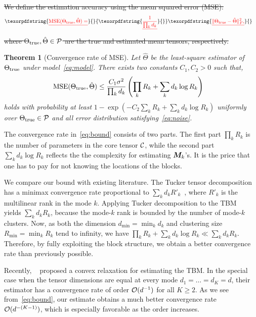 \documentclass[11pt]{article}
\theoremstyle{plain}
\newtheorem{theorem}{Theorem}
\theoremstyle{definition}
\providecommand{\DIFaddtex}[1]{{\protect\color{blue}\uwave{#1}}} %
\providecommand{\DIFdeltex}[1]{{\protect\color{red}\sout{#1}}}                      %
\providecommand{\DIFaddbegin}{} %
\providecommand{\DIFaddend}{} %
\providecommand{\DIFdelbegin}{} %
\providecommand{\DIFdelend}{} %
\providecommand{\DIFadd}[1]{\texorpdfstring{\DIFaddtex{#1}}{#1}} %
\providecommand{\DIFdel}[1]{\texorpdfstring{\DIFdeltex{#1}}{}} %
\begin{document}
\DIFdelbegin \DIFdel{We define the estimation accuracy using the mean squared error (MSE):
}\begin{displaymath}\DIFdel{%
\text{MSE}(\trueT,\hat \Theta)=}{\DIFdel{1\over \prod_k d_k}}\DIFdel{\FnormSize{}{\trueT-\hat \Theta}^2,
}\end{displaymath}
\DIFdel{where $\Theta_{\text{true}}, \hat \Theta\in\mathcal{P}$ are the true and estimated mean tensors, respectively.
}%

\DIFdelend \DIFaddbegin \begin{theorem}[Convergence rate of MSE] \label{thm:mse}
\DIFaddend Let $\hat \Theta$ be the least-square estimator of $\Theta_{\text{true}}$ under model~\eqref{eq:model}. There exists two constants $C_1, C_2>0$ such that,  
\begin{equation} \label{eq:bound}
\text{MSE}(\Theta_{\text{true}},\hat \Theta)\leq {C_1 \sigma^2\over  \prod_k d_k} \left(\prod_k R_k+\sum_k d_k \log R_k\right)
\end{equation}
holds with probability at least $1-\exp(-C_2\sum_k R_k+\sum_k d_k\log R_k)$ uniformly over $\Theta_{\text{true}}\in\mathcal{P}$ and all error distribution satisfying~\eqref{eq:noise}. 
\end{theorem}

The convergence rate \DIFaddbegin \DIFadd{of MSE }\DIFaddend in~\eqref{eq:bound} consists of two parts. The first part $\prod_k R_k$ is the number of parameters in the core tensor $\mathcal{C}$, while the second part $\sum_k d_k \log R_k$ reflects the the complexity for estimating $\bm M_k$'s. It is the price that one has to pay for not knowing the locations of the blocks.  

We compare our bound with existing literature. The Tucker tensor decomposition has a minimax convergence rate proportional to $\sum_kd_kR'_k$~\cite{zhang2018tensor}, where $R'_k$ is the multilinear rank in the mode $k$. Applying Tucker decomposition to the TBM yields $\sum_kd_kR_k$, because the mode-$k$ rank is bounded by the number of mode-$k$ clusters. Now, as both the dimension $d_{\min}=\min_kd_k$ and clustering size $R_{\min}=\min_k R_k$ tend to infinity, we have $\prod_k R_k+ \sum_k d_k \log R_k\ll \sum_k d_k R_k$. Therefore, by fully exploiting the block structure, we obtain a better convergence rate than previously possible. 

Recently, ~\cite{chi2018provable} proposed a convex relaxation for estimating the TBM. In the special case when the tensor dimensions are equal at every mode $d_1=\ldots=d_K=d$, their estimator has a convergence rate of order $\mathcal{O}(d^{-1})$ for all $K\geq 2$. As we see from~\eqref{eq:bound}, our estimate obtains a much better convergence rate $\mathcal{O}(d^{-(K-1)})$, which is especially favorable as the order increases. 
\end{document}
